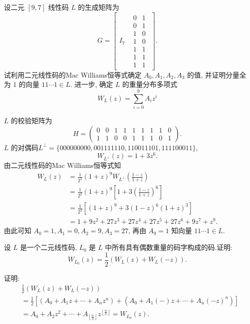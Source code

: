 \begin{exercise}
 设二元 $ [9,7] $ 线性码 $ L $ 的生成矩阵为
$$
G = \left[
\begin{array}{c|cc}
I_7 & \begin{matrix}
0 & 1 \\
0 & 1 \\
1 & 0 \\
1 & 0 \\
1 & 1 \\
1 & 1 \\
1 & 1
\end{matrix}
\end{array}
\right].
$$
试利用二元线性码的Mac Williams恒等式确定 $ A_{0}, A_{1}, A_{2}, A_{3} $ 的值, 并证明分量全为 1 的向量 $ 11 \cdots 1 \in L $. 进一步, 确定 $ L $ 的重量分布多项式
$$
W_{L}(z)=\sum_{i=0}^{9} A_{i} z^{i}
$$
\end{exercise}
\begin{solution}
 $ L $ 的校验矩阵为
$$
H=\left(\begin{array}{lllllll|ll}
0 & 0 & 1 & 1 & 1 & 1 & 1 & 1 & 0 \\
1 & 1 & 0 & 0 & 1 & 1 & 1 & 0 & 1
\end{array}\right) .
$$
$ L $ 的对偶码$L^{\perp}=\{000000000,001111110,110011101,111100011\}$,
$$
W_{L^{\perp}}(z)=1+3 z^{6} .
$$
由二元线性码的Mac Williams恒等式知
$$
\begin{aligned}
W_{L}(z)&=\frac{1}{2^{2}}(1+z)^{9} W_{L^{\perp}}\left(\frac{1-z}{1+z}\right) \\
&=\frac{1}{2^{2}}(1+z)^{9}\left[1+3\left(\frac{1-z}{1+z}\right)^{6}\right]\\
&=\frac{1}{2^{2}}\left[(1+z)^{9}+3(1-z)^{6}(1+z)^{3}\right] \\
&=1+9 z^{2}+27 z^{3}+27 z^{4}+27 z^{5}+27 z^{6}+9 z^{7}+z^{9} .
\end{aligned}
$$
由此可知 $ A_{0}=1, A_{1}=0, A_{2}=9, A_{3}=27 $, 再由 $ A_{9}=1 $ 知向量 $ 11 \cdots 1 \in L $.
\end{solution}


\begin{exercise}
设 $ L $ 是一个二元线性码, $ L_{0} $ 是 $ L $ 中所有具有偶数重量的码字构成的码.证明:
$$
W_{L_{0}}(z)=\frac{1}{2}\left(W_{L}(z)+W_{L}(-z)\right) .
$$
\end{exercise}
\begin{solution}
    证明:
$$
\begin{aligned}
&\frac{1}{2}\left(W_{L}(z)+W_{L}(-z)\right)\\
&=\frac{1}{2}\left[\left(A_{0}+A_{1} z+\cdots+A_{n} z^{n}\right)+\left(A_{0}+A_{1}(-) z+\cdots+A_{n}(-z)^{n}\right)\right] \\
&=A_{0}+A_{2} z^{2}+\cdots+A_{\left\lfloor\frac{n}{2}\right\rfloor} z^{\left\lfloor\frac{n}{2}\right\rfloor}=W_{L_{0}}(z) .
\end{aligned}
$$
\end{solution}

